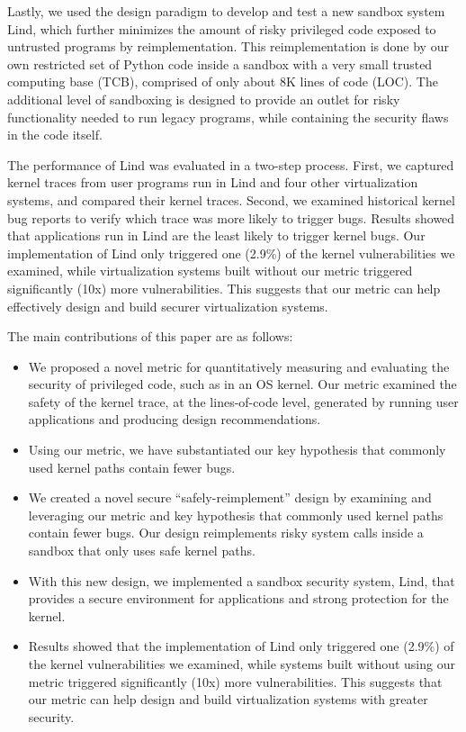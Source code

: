 Lastly, we used the design paradigm to develop and test a new sandbox system Lind, 
which further minimizes the amount of risky privileged code exposed to untrusted programs 
by reimplementation. This reimplementation is done by our own restricted set of Python code 
inside a sandbox with a very small trusted computing base (TCB), comprised of only about 
8K lines of code (LOC). The additional level of sandboxing is designed to provide an outlet 
for risky functionality needed to run legacy programs,  while containing the security flaws in the code itself. 

The performance of Lind was evaluated in a two-step process. 
First, we captured kernel traces from user programs run in Lind and four other virtualization systems, 
and compared their kernel traces. Second, we examined historical kernel bug reports to 
verify which trace was more likely to trigger bugs. Results showed that applications run in 
Lind are the least likely to trigger kernel bugs. Our implementation of Lind 
only triggered one (2.9\%) of the kernel vulnerabilities we examined, 
while virtualization systems built without our metric triggered significantly (10x) more vulnerabilities. 
This suggests that our metric can help effectively design and build securer virtualization systems.

The main contributions of this paper are as follows:

\begin{itemize}
\item We proposed a novel metric for quantitatively measuring and evaluating 
the security of privileged code, such as in an OS kernel. Our metric examined the safety of the kernel trace, 
at the lines-of-code level, generated by running user applications and producing design recommendations.

\item Using our metric, we have substantiated our key hypothesis that 
commonly used kernel paths contain fewer bugs. 

\item We created a novel secure ``safely-reimplement'' design by examining and leveraging our metric 
and key hypothesis that commonly used kernel paths contain fewer bugs. 
Our design reimplements risky system calls inside a sandbox that only uses safe kernel paths. 

\item With this new design, we implemented a sandbox security system, Lind, 
that provides a secure environment for applications and strong protection for the kernel.

\item Results showed that the implementation of Lind only triggered one (2.9\%) 
of the kernel vulnerabilities we examined, while systems built without using 
our metric triggered significantly (10x) more vulnerabilities. 
This suggests that our metric can help design and build virtualization systems with greater security. 
\end{itemize}

